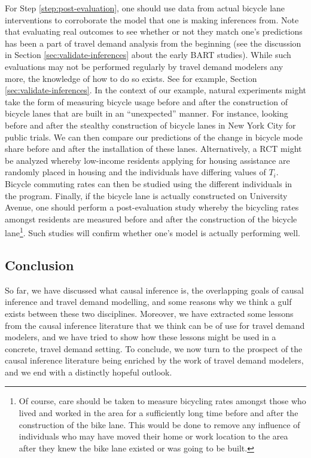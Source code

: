 For Step \ref{step:post-evaluation}, one should use data from actual bicycle lane interventions to corroborate the model that one is making inferences from. Note that evaluating real outcomes to see whether or not they match one's predictions has been a part of travel demand analysis from the beginning (see the discussion in Section \ref{sec:validate-inferences} about the early BART studies). While such evaluations may not be performed regularly by travel demand modelers any more, the knowledge of how to do so exists. See for example, Section \ref{sec:validate-inferences}. In the context of our example, natural experiments might take the form of measuring bicycle usage before and after the construction of bicycle lanes that are built in an ``unexpected'' manner. For instance, looking before and after the stealthy construction of bicycle lanes in New York City for public trials. We can then compare our predictions of the change in bicycle mode share before and after the installation of these lanes. Alternatively, a RCT might be analyzed whereby low-income residents applying for housing assistance are randomly placed in housing and the individuals have differing values of $T_i$. Bicycle commuting rates can then be studied using the different individuals in the program. Finally, if the bicycle lane is actually constructed on University Avenue, one should perform a post-evaluation study whereby the bicycling rates amongst residents are measured before and after the construction of the bicycle lane\footnote{Of course, care should be taken to measure bicycling rates amongst those who lived and worked in the area for a sufficiently long time before and after the construction of the bike lane. This would be done to remove any influence of individuals who may have moved their home or work location to the area after they knew the bike lane existed or was going to be built.}. Such studies will confirm whether one's model is actually performing well.

\subsection{Conclusion}
\label{sec:giving_back_to_causality}
So far, we have discussed what causal inference is, the overlapping goals of causal inference and travel demand modelling, and some reasons why we think a gulf exists between these two disciplines. Moreover, we have extracted some lessons from the causal inference literature that we think can be of use for travel demand modelers, and we have tried to show how these lessons might be used in a concrete, travel demand setting. To conclude, we now turn to the prospect of the causal inference literature being enriched by the work of travel demand modelers, and we end with a distinctly hopeful outlook.

